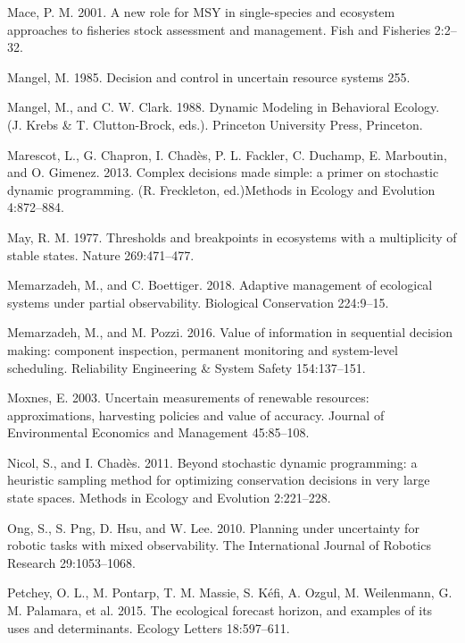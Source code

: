 \documentclass[3p]{elsarticle} %
\begin{document}
\leavevmode\hypertarget{ref-Mace2001}{}%
Mace, P. M. 2001. A new role for MSY in single-species and ecosystem
approaches to fisheries stock assessment and management. Fish and
Fisheries 2:2--32.

\leavevmode\hypertarget{ref-Mangel1985}{}%
Mangel, M. 1985. Decision and control in uncertain resource systems 255.

\leavevmode\hypertarget{ref-Mangel1988}{}%
Mangel, M., and C. W. Clark. 1988. Dynamic Modeling in Behavioral
Ecology. (J. Krebs \& T. Clutton-Brock, eds.). Princeton University
Press, Princeton.

\leavevmode\hypertarget{ref-Marescot2013}{}%
Marescot, L., G. Chapron, I. Chadès, P. L. Fackler, C. Duchamp, E.
Marboutin, and O. Gimenez. 2013. Complex decisions made simple: a primer
on stochastic dynamic programming. (R. Freckleton, ed.)Methods in
Ecology and Evolution 4:872--884.

\leavevmode\hypertarget{ref-May1977}{}%
May, R. M. 1977. Thresholds and breakpoints in ecosystems with a
multiplicity of stable states. Nature 269:471--477.

\leavevmode\hypertarget{ref-Memarzadeh2018}{}%
Memarzadeh, M., and C. Boettiger. 2018. Adaptive management of
ecological systems under partial observability. Biological Conservation
224:9--15.

\leavevmode\hypertarget{ref-Memarzadeh2016b}{}%
Memarzadeh, M., and M. Pozzi. 2016. Value of information in sequential
decision making: component inspection, permanent monitoring and
system-level scheduling. Reliability Engineering \& System Safety
154:137--151.

\leavevmode\hypertarget{ref-Moxnes2003}{}%
Moxnes, E. 2003. Uncertain measurements of renewable resources:
approximations, harvesting policies and value of accuracy. Journal of
Environmental Economics and Management 45:85--108.

\leavevmode\hypertarget{ref-Nicol2011}{}%
Nicol, S., and I. Chadès. 2011. Beyond stochastic dynamic programming: a
heuristic sampling method for optimizing conservation decisions in very
large state spaces. Methods in Ecology and Evolution 2:221--228.

\leavevmode\hypertarget{ref-Ong2010}{}%
Ong, S., S. Png, D. Hsu, and W. Lee. 2010. Planning under uncertainty
for robotic tasks with mixed observability. The International Journal of
Robotics Research 29:1053--1068.

\leavevmode\hypertarget{ref-Petchy2015}{}%
Petchey, O. L., M. Pontarp, T. M. Massie, S. Kéfi, A. Ozgul, M.
Weilenmann, G. M. Palamara, et al. 2015. The ecological forecast
horizon, and examples of its uses and determinants. Ecology Letters
18:597--611.
\end{document}

